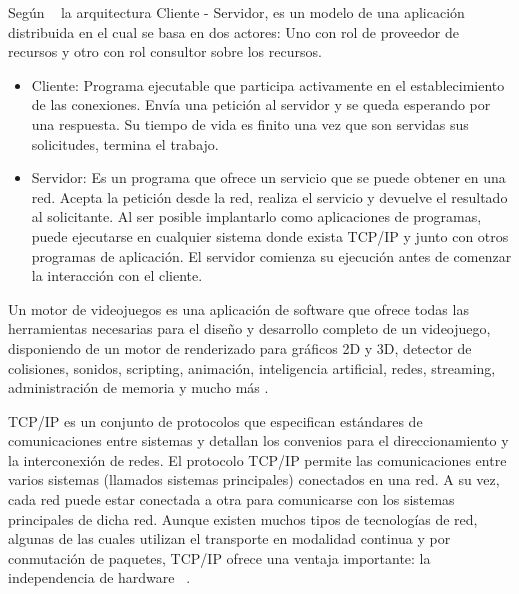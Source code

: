 \vspace{10pt}
Según ~\cite{moyano2020arquitectura} la arquitectura Cliente - Servidor, es 
un modelo de una aplicación distribuida en el cual se basa en dos actores:
Uno con rol de proveedor de recursos y otro con rol consultor sobre los recursos.
\begin{itemize}
    \item Cliente: Programa ejecutable que participa activamente en el establecimiento de las conexiones. Envía una petición al servidor y se queda
    esperando por una respuesta. Su tiempo de vida es finito una vez que son
    servidas sus solicitudes, termina el trabajo.
    \item Servidor: Es un programa que ofrece un servicio que se puede obtener
    en una red. Acepta la petición desde la red, realiza el servicio y devuelve
    el resultado al solicitante. Al ser posible implantarlo como aplicaciones de
    programas, puede ejecutarse en cualquier sistema donde exista TCP/IP y
    junto con otros programas de aplicación. El servidor comienza su ejecución
    antes de comenzar la interacción con el cliente.
\end{itemize}

\vspace{10pt}

\vspace{2pt}
Un motor de videojuegos es una aplicación de software que ofrece todas las herramientas necesarias para el diseño y desarrollo completo de un videojuego, disponiendo de un motor de renderizado para gráficos 2D y 3D, detector de colisiones, sonidos, scripting, animación, inteligencia artificial, redes, streaming, administración de memoria y mucho más \cite{arce2011desarrollo}.

\vspace{10pt}
TCP/IP es un conjunto de protocolos que especifican estándares de comunicaciones entre sistemas y detallan los convenios para el direccionamiento y la interconexión de redes. El protocolo TCP/IP permite las comunicaciones entre varios sistemas (llamados sistemas principales) conectados en una red. A su vez, cada red puede estar conectada a otra para comunicarse con los sistemas principales de dicha red. Aunque existen muchos tipos de tecnologías de red, algunas de las cuales utilizan el transporte en modalidad continua y por conmutación de paquetes, TCP/IP ofrece una ventaja importante: la independencia de hardware ~\cite{protocolo-tcp-ip}.

